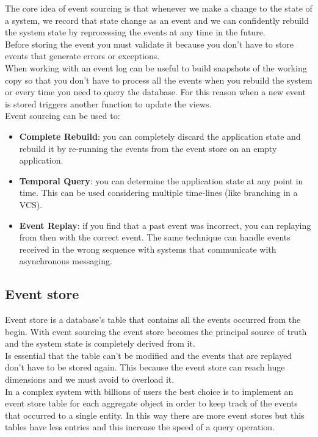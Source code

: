 \newpage
{}
The core idea of event sourcing is that whenever we make a change to the state of a system, we record that state change as an event and we can confidently rebuild the system state by reprocessing the events at any time in the future.\\
Before storing the event you must validate it because you don't have to store events that generate errors or exceptions.\\ 
When working with an event log can be useful to build snapshots of the working copy so that you don't have to process all the events when you rebuild the system or every time you need to query the database. For this reason when a new event is stored triggers another function to update the views.\\
Event sourcing can be used to:
\begin{itemize}
	\item \textbf{Complete Rebuild}: you can completely discard the application state  and rebuild it by re-running the events from the event store on an empty application.
	\item \textbf{Temporal Query}: you can determine the application state at any point in time. This can be used considering multiple time-lines (like branching in a VCS).
	\item \textbf{Event Replay}: if you find that a past event was incorrect, you can replaying from then with the correct event. The same technique can handle events received in the wrong sequence with systems that communicate with asynchronous messaging.
	
\end{itemize}

\subsection{Event store}
Event store is a database's table that contains all the events occurred from the begin.
With event sourcing the event store becomes the principal source of truth and the system state is completely derived from it. \\
Is essential that the table can't be modified and the events that are replayed don't have to be stored again. 
This because the event store can reach huge dimensions and we must avoid to overload it.\\
In a complex system with billions of users the best choice is to implement an event store table for each aggregate object in order to keep track of the events that occurred to a single entity. In this way there are more event stores but this tables have less entries and this increase the speed of a query operation.

